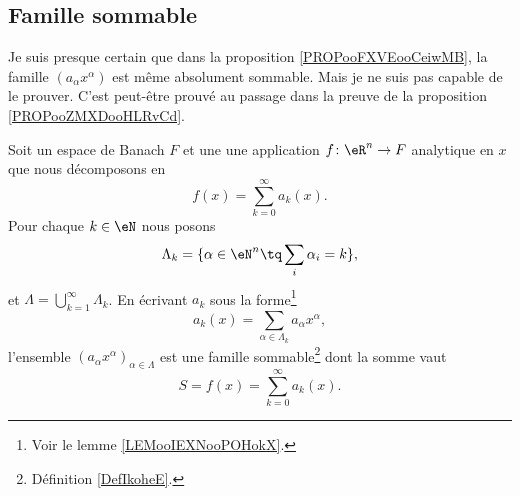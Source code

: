 \subsection{Famille sommable}

\begin{probleme}
	Je suis presque certain que dans la proposition \ref{PROPooFXVEooCeiwMB}, la famille \( (a_{\alpha}x^{\alpha})\) est même absolument sommable. Mais je ne suis pas capable de le prouver. C'est peut-être prouvé au passage dans la preuve de la proposition \ref{PROPooZMXDooHLRvCd}.
\end{probleme}

\begin{proposition}	\label{PROPooFXVEooCeiwMB}
	Soit un espace de Banach \( F\) et une une application \(f \colon \eR^n\to F  \) analytique en \( x\) que nous décomposons en
	\begin{equation}
		f(x)=\sum_{k=0}^{\infty}a_k(x).
	\end{equation}
	Pour chaque \( k\in \eN\) nous posons
	\begin{equation}
		\Lambda_k=\{ \alpha\in \eN^n\tq \sum_i\alpha_i=k \},
	\end{equation}
	et \( \Lambda=\bigcup_{k=1}^{\infty}\Lambda_k\). En écrivant \( a_k\) sous la forme\footnote{Voir le lemme \ref{LEMooIEXNooPOHokX}.}
	\begin{equation}
		a_k(x)=\sum_{\alpha\in\Lambda_k}a_{\alpha}x^{\alpha},
	\end{equation}
	l'ensemble \( (a_{\alpha}x^{\alpha})_{\alpha\in\Lambda}\) est une famille sommable\footnote{Définition \ref{DefIkoheE}.} dont la somme vaut
	\begin{equation}
		S=f(x)=\sum_{k=0}^{\infty}a_k(x).
	\end{equation}
\end{proposition}

